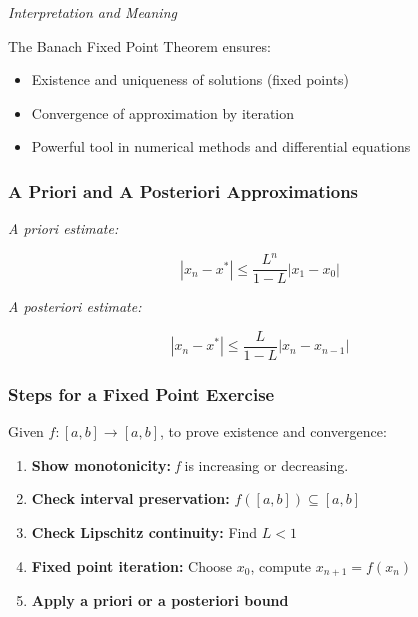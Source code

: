 \emph{Interpretation and Meaning}

The Banach Fixed Point Theorem ensures:

\begin{itemize}

    \item Existence and uniqueness of solutions (fixed points)

    \item Convergence of approximation by iteration

    \item Powerful tool in numerical methods and differential equations

\end{itemize}

\subsubsection{A Priori and A Posteriori Approximations}

\emph{A priori estimate:}

\[
    |x_n - x^*| \le \frac{L^n}{1 - L} |x_1 - x_0|
\]

\emph{A posteriori estimate:}

\[
    |x_n - x^*| \le \frac{L}{1 - L} |x_n - x_{n-1}|
\]

\subsubsection{Steps for a Fixed Point Exercise}

Given \(f: [a, b] \to [a, b]\), to prove existence and convergence:

\begin{enumerate}

    \item \textbf{Show monotonicity:} \emph{f} is increasing or decreasing.

    \item \textbf{Check interval preservation:} \(f([a, b]) \subseteq [a, b]\)

    \item \textbf{Check Lipschitz continuity:} Find \(L < 1\)

    \item \textbf{Fixed point iteration:} Choose \(x_0\), compute \(x_{n+1} = f(x_n)\)

    \item \textbf{Apply a priori or a posteriori bound}

\end{enumerate}

